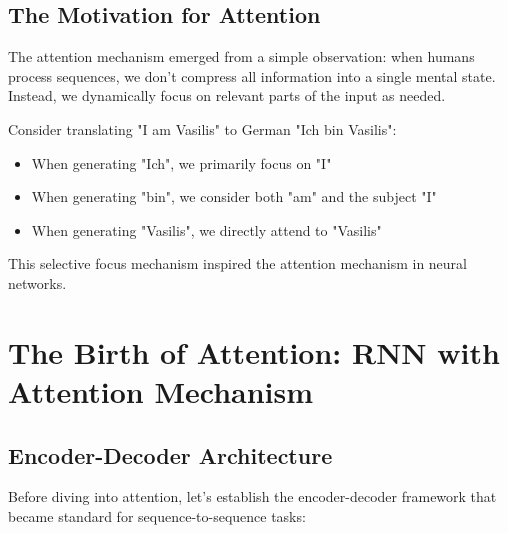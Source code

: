 \documentclass[11pt]{article}
\begin{document}
\subsection{The Motivation for Attention}

The attention mechanism emerged from a simple observation: when humans process sequences, we don't compress all information into a single mental state. Instead, we dynamically focus on relevant parts of the input as needed.

Consider translating "I am Vasilis" to German "Ich bin Vasilis":
\begin{itemize}
    \item When generating "Ich", we primarily focus on "I"
    \item When generating "bin", we consider both "am" and the subject "I"
    \item When generating "Vasilis", we directly attend to "Vasilis"
\end{itemize}

This selective focus mechanism inspired the attention mechanism in neural networks.

\section{The Birth of Attention: RNN with Attention Mechanism}

\subsection{Encoder-Decoder Architecture}

Before diving into attention, let's establish the encoder-decoder framework that became standard for sequence-to-sequence tasks:
\end{document}
